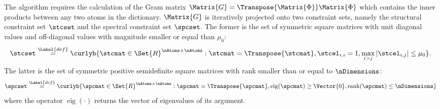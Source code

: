 \documentclass{article}
\def \Dic{\Matrix{\Phi}} %
\def \coherence{\mu} 		%
\def \definition{\overset{\Label{def}}{=}}	%
\def \Gram{\Matrix{G}} 						%
\def \ambient{\Set{R}} 						%
\begin{document}
The  algorithm requires the calculation of the Gram matrix $\Gram=\Transpose{\Dic}\Dic$ which contains the inner products between any two atoms in the dictionary. $\Gram$ is iteratively projected onto two constraint sets, namely the structural constraint set $\stcset$ and the spectral constraint set $\spcset$. The former is the set of symmetric square matrices with unit diagonal values and off-diagonal values with magnitude smaller or equal than $\coherence_{0}$:
\small
\begin{equation*}
	\stcset \definition \curlyb{\stcmat \in \ambient^{\nAtoms \times \nAtoms} : \stcmat = \Transpose{\stcmat}, \stcel_{i,i}=1,\max_{i > j}|\stcel_{i,j}|\leq \coherence_{0}}.
\end{equation*}
\normalsize
The latter is the set of symmetric positive semidefinite square matrices with rank smaller than or equal to $\nDimensions$:
\begin{equation*}
\spcset \definition \curlyb{ \spcmat \in \ambient^{\nAtoms \times \nAtoms} : \spcmat = \Transpose{\spcmat}, \operatorname{eig}(\spcmat)\geq \Vector{0}, \operatorname{rank}(\spcmat)\leq \nDimensions}
\end{equation*}  
where the operator $\operatorname{eig}(\cdot)$ returns the vector of eigenvalues of its argument.
\end{document}

